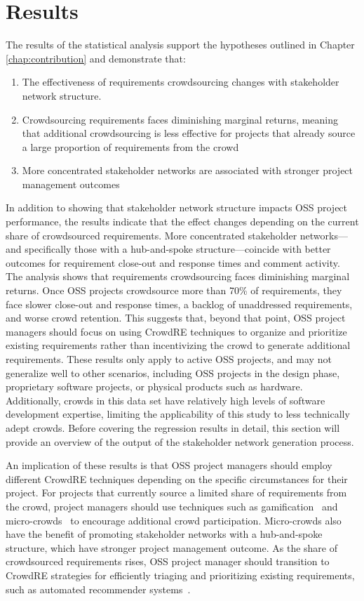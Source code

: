 \chapter{Results} \label{chap:results}

The results of the statistical analysis support the hypotheses outlined in Chapter \ref{chap:contribution} and demonstrate that:
\begin{enumerate}
    \item The effectiveness of requirements crowdsourcing changes with stakeholder network structure.
    \item Crowdsourcing requirements faces diminishing marginal returns, meaning that additional crowdsourcing is less effective for projects that already source a large proportion of requirements from the crowd
    \item More concentrated stakeholder networks are associated with stronger project management outcomes
\end{enumerate}

In addition to showing that stakeholder network structure impacts OSS project performance, the results indicate that the effect changes depending on the current share of crowdsourced requirements. More concentrated stakeholder networks---and specifically those with a hub-and-spoke structure---coincide with better outcomes for requirement close-out and response times and comment activity. The analysis shows that requirements crowdsourcing faces diminishing marginal returns. Once OSS projects crowdsource more than 70\% of requirements, they face slower close-out and response times, a backlog of unaddressed requirements, and worse crowd retention. This suggests that, beyond that point, OSS project managers should focus on using CrowdRE techniques to organize and prioritize existing requirements rather than incentivizing the crowd to generate additional requirements. These results only apply to active OSS projects, and may not generalize well to other scenarios, including OSS projects in the design phase, proprietary software projects, or physical products such as hardware. Additionally, crowds in this data set have relatively high levels of software development expertise, limiting the applicability of this study to less technically adept crowds. Before covering the regression results in detail, this section will provide an overview of the output of the stakeholder network generation process.

An implication of these results is that OSS project managers should employ different CrowdRE techniques depending on the specific circumstances for their project. For projects that currently source a limited share of requirements from the crowd, project managers should use techniques such as gamification~\cite{dalpiaz} and micro-crowds~\cite{levy} to encourage additional crowd participation. Micro-crowds also have the benefit of promoting stakeholder networks with a hub-and-spoke structure, which have stronger project management outcome. As the share of crowdsourced requirements rises, OSS project manager should transition to  CrowdRE strategies for efficiently triaging and prioritizing existing requirements, such as automated recommender systems~\cite{mobasher}.

